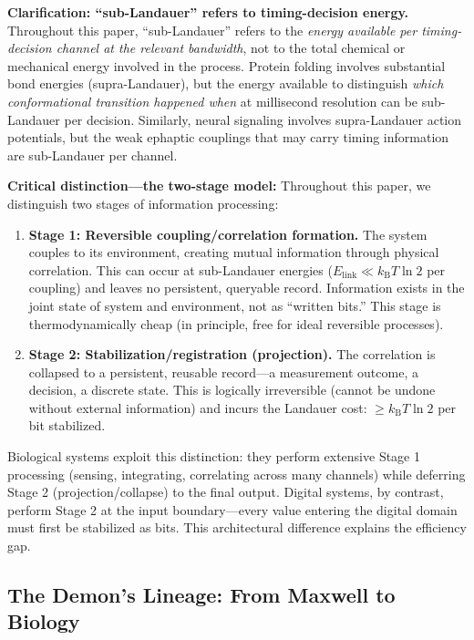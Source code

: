 \documentclass[12pt]{article}
\numberwithin{equation}{section}
\newcommand{\kB}{k_{\mathrm{B}}}
\begin{document}
\textbf{Clarification: ``sub-Landauer'' refers to timing-decision energy.} Throughout this paper, ``sub-Landauer'' refers to the \emph{energy available per timing-decision channel at the relevant bandwidth}, not to the total chemical or mechanical energy involved in the process. Protein folding involves substantial bond energies (supra-Landauer), but the energy available to distinguish \emph{which conformational transition happened when} at millisecond resolution can be sub-Landauer per decision. Similarly, neural signaling involves supra-Landauer action potentials, but the weak ephaptic couplings that may carry timing information are sub-Landauer per channel.

\textbf{Critical distinction---the two-stage model:} Throughout this paper, we distinguish two stages of information processing:

\begin{enumerate}
\item \textbf{Stage 1: Reversible coupling/correlation formation.} The system couples to its environment, creating mutual information through physical correlation. This can occur at sub-Landauer energies ($E_{\text{link}} \ll \kB T\ln 2$ per coupling) and leaves no persistent, queryable record. Information exists in the joint state of system and environment, not as ``written bits.'' This stage is thermodynamically cheap (in principle, free for ideal reversible processes).

\item \textbf{Stage 2: Stabilization/registration (projection).} The correlation is collapsed to a persistent, reusable record---a measurement outcome, a decision, a discrete state. This is logically irreversible (cannot be undone without external information) and incurs the Landauer cost: $\ge \kB T\ln 2$ per bit stabilized.
\end{enumerate}

Biological systems exploit this distinction: they perform extensive Stage 1 processing (sensing, integrating, correlating across many channels) while deferring Stage 2 (projection/collapse) to the final output. Digital systems, by contrast, perform Stage 2 at the input boundary---every value entering the digital domain must first be stabilized as bits. This architectural difference explains the efficiency gap.

\medskip
\subsection{The Demon's Lineage: From Maxwell to Biology}
\end{document}

